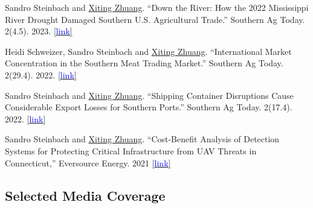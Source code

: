 \documentclass[11 pt,letterpaper]{article}
\renewenvironment{itemize}{
	\begin{list}{}{
			\setlength{\leftmargin}{1.5em}
		}
	}{
	\end{list}
}
\begin{document}
\begin{itemize}
	
	
	
	
	
	\item[-]  Sandro Steinbach and  \underline{Xiting Zhuang}. ``Down the River: How the 2022 Mississippi River Drought Damaged Southern U.S. Agricultural Trade.'' Southern Ag Today. 2(4.5).  2023.  	\href{https://southernagtoday.org/2023/05/04/down-the-river-how-the-2022-mississippi-river-drought-damaged/}{[{\underline{\textcolor{blue}{link}}}]}  
	
	
	\item[-] Heidi Schweizer, Sandro Steinbach and  \underline{Xiting Zhuang}. ``International Market Concentration in the Southern Meat Trading Market.'' Southern Ag Today. 2(29.4).  2022.  	\href{https://southernagtoday.org/2022/07/international-market-concentration-in-the-southern-meat-trading-market/}{[{\underline{\textcolor{blue}{link}}}]}  
	
	

 	



	\item[-] Sandro Steinbach and  \underline{Xiting Zhuang}.  ``Shipping Container Disruptions Cause Considerable Export Losses for Southern Ports.''  Southern Ag Today. 2(17.4).  2022.  
	\href{https://southernagtoday.org/2022/04/shipping-container-disruptions-cause-considerable-export-losses-for-southern-ports/}{[{\underline{\textcolor{blue}{link}}}]}  
	
	
	
	\item[-] Sandro Steinbach and  \underline{Xiting Zhuang}. ``Cost-Benefit Analysis of Detection Systems for Protecting Critical Infrastructure from UAV Threats in Connecticut,'' Eversource Energy. 2021 
			\href{https://www.dropbox.com/s/hmnrb6rljgsyvei/UConn%20CBA%20Report%202021.pdf?dl=0}{[{\underline{\textcolor{blue}{link}}}]}  
	
	
\end{itemize}



 \subsection*{\textbf{Selected Media Coverage}}
 
\end{document}

